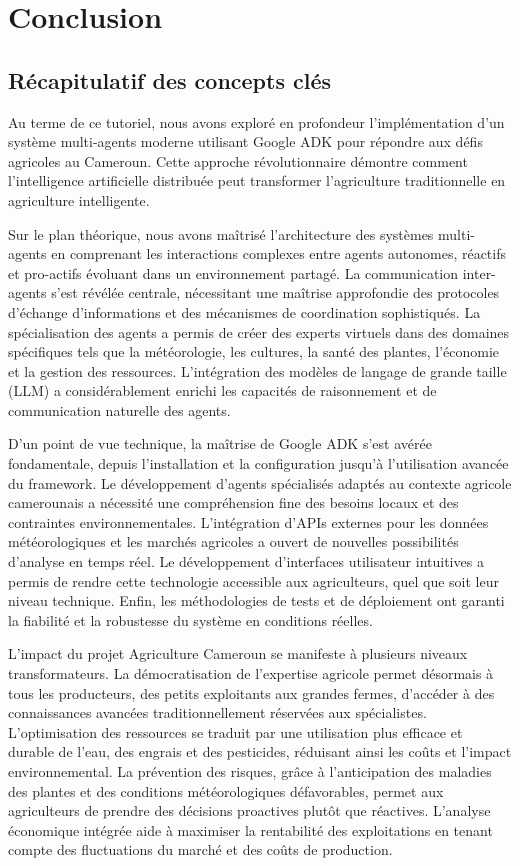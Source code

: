 \chapter*{Conclusion}

\section*{Récapitulatif des concepts clés}

Au terme de ce tutoriel, nous avons exploré en profondeur l'implémentation d'un système multi-agents moderne utilisant Google ADK pour répondre aux défis agricoles au Cameroun. Cette approche révolutionnaire démontre comment l'intelligence artificielle distribuée peut transformer l'agriculture traditionnelle en agriculture intelligente.

Sur le plan théorique, nous avons maîtrisé l'architecture des systèmes multi-agents en comprenant les interactions complexes entre agents autonomes, réactifs et pro-actifs évoluant dans un environnement partagé. La communication inter-agents s'est révélée centrale, nécessitant une maîtrise approfondie des protocoles d'échange d'informations et des mécanismes de coordination sophistiqués. La spécialisation des agents a permis de créer des experts virtuels dans des domaines spécifiques tels que la météorologie, les cultures, la santé des plantes, l'économie et la gestion des ressources. L'intégration des modèles de langage de grande taille (LLM) a considérablement enrichi les capacités de raisonnement et de communication naturelle des agents.

D'un point de vue technique, la maîtrise de Google ADK s'est avérée fondamentale, depuis l'installation et la configuration jusqu'à l'utilisation avancée du framework. Le développement d'agents spécialisés adaptés au contexte agricole camerounais a nécessité une compréhension fine des besoins locaux et des contraintes environnementales. L'intégration d'APIs externes pour les données météorologiques et les marchés agricoles a ouvert de nouvelles possibilités d'analyse en temps réel. Le développement d'interfaces utilisateur intuitives a permis de rendre cette technologie accessible aux agriculteurs, quel que soit leur niveau technique. Enfin, les méthodologies de tests et de déploiement ont garanti la fiabilité et la robustesse du système en conditions réelles.

L'impact du projet Agriculture Cameroun se manifeste à plusieurs niveaux transformateurs. La démocratisation de l'expertise agricole permet désormais à tous les producteurs, des petits exploitants aux grandes fermes, d'accéder à des connaissances avancées traditionnellement réservées aux spécialistes. L'optimisation des ressources se traduit par une utilisation plus efficace et durable de l'eau, des engrais et des pesticides, réduisant ainsi les coûts et l'impact environnemental. La prévention des risques, grâce à l'anticipation des maladies des plantes et des conditions météorologiques défavorables, permet aux agriculteurs de prendre des décisions proactives plutôt que réactives. L'analyse économique intégrée aide à maximiser la rentabilité des exploitations en tenant compte des fluctuations du marché et des coûts de production.

